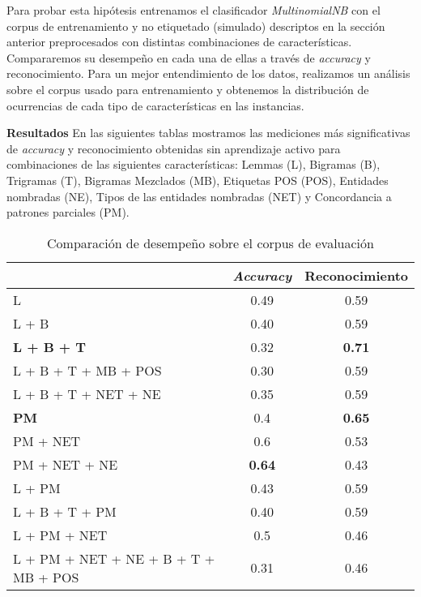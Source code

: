 Para probar esta hipótesis entrenamos el clasificador \textit{MultinomialNB} con el corpus de entrenamiento y no etiquetado (simulado) descriptos en la sección anterior preprocesados con distintas combinaciones de características. Compararemos su desempeño en cada una de ellas a través de \textit{accuracy} y reconocimiento. Para un mejor entendimiento de los datos, realizamos un análisis sobre el corpus usado para entrenamiento y obtenemos la distribución de ocurrencias de cada tipo de características en las instancias.

\vspace{3 mm}

\textbf{Resultados} En las siguientes tablas mostramos las mediciones más significativas de \textit{accuracy} y reconocimiento obtenidas sin aprendizaje activo para combinaciones de las siguientes características: Lemmas (L), Bigramas (B), Trigramas (T), Bigramas Mezclados (MB), Etiquetas POS (POS), Entidades nombradas (NE), Tipos de las entidades nombradas (NET) y Concordancia a patrones parciales (PM).

\begin{table}[h!]\label{tabla-exp3}
\centering
\begin{tabular}{l c c}
     & \textit{Accuracy} & Reconocimiento \\ [0.5ex]
    \hline
    L & 0.49 & 0.59 \\ [0.5ex]
    L + B & 0.40 & 0.59 \\ [0.5ex]
    \textbf{L + B + T} & 0.32 & \textbf{0.71} \\[0.5ex]
    L + B + T + MB + POS & 0.30 & 0.59 \\[0.5ex]
    L + B + T + NET + NE & 0.35 & 0.59 \\[0.5ex]
    \textbf{PM} & 0.4 & \textbf{0.65} \\[0.5ex]
    PM + NET & 0.6 & 0.53 \\[0.5ex]
    PM + NET + NE & \textbf{0.64} & 0.43 \\[0.5ex]
    L + PM & 0.43 & 0.59 \\[0.5ex]
    L + B + T + PM & 0.40 & 0.59 \\[0.5ex]
    L + PM + NET & 0.5 & 0.46 \\[0.5ex]
    L + PM + NET + NE + B + T + MB + POS & 0.31 & 0.46 \\[0.5ex]
    \hline
\end{tabular}
\caption{Comparación de desempeño sobre el corpus de evaluación}
\end{table}

